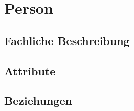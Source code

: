 \section{Person}
\label{sec:Person}
\subsection{Fachliche Beschreibung}
\label{sec:Person_Fachliche_Beschreibung}
\subsection{Attribute}
\label{sec:Person_Attribute}
\subsection{Beziehungen}
\label{sec:Person_Beziehungen}